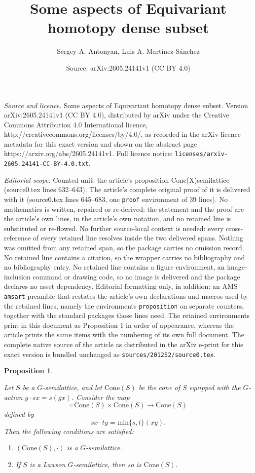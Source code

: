 \documentclass[10pt,a4paper]{amsart}
\title{Some aspects of Equivariant homotopy dense subset}
\author{Sergey A. Antonyan, Luis A. Mart\'inez-S\'anchez}
\date{Source: arXiv:2605.24141v1 (CC BY 4.0)}
\newtheorem{proposition}{Proposition}
\begin{document}
\maketitle

\noindent\emph{Source and licence.} Some aspects of Equivariant homotopy dense subset. Version arXiv:2605.24141v1 (CC BY 4.0), distributed by arXiv under the Creative Commons Attribution 4.0 International licence, http://creativecommons.org/licenses/by/4.0/, as recorded in the arXiv licence metadata for this exact version and shown on the abstract page https://arxiv.org/abs/2605.24141v1. Full licence notice: \texttt{licenses/arxiv-2605.24141-CC-BY-4.0.txt}.\par\smallskip

\noindent\textit{Editorial scope.} Counted unit: the article's proposition Cone(X)semilattice (source0.tex lines 632--643). The article's complete original proof of it is delivered with it (source0.tex lines 645--683, one \texttt{proof} environment of 39 lines). No mathematics is written, repaired or re-derived: the statement and the proof are the article's own lines, in the article's own notation, and no retained line is substituted or re-flowed.  No further source-local context is needed: every cross-reference of every retained line resolves inside the two delivered spans.  Nothing was omitted from any retained span, so the package carries no omission record.  No retained line contains a citation, so the wrapper carries no bibliography and no bibliography entry.  No retained line contains a figure environment, an image-inclusion command or drawing code, so no image is delivered and the package declares no asset dependency.  Editorial formatting only, in addition: an AMS \texttt{amsart} preamble that restates the article's own declarations and macros used by the retained lines, namely the environments \texttt{proposition} on separate counters, together with the standard packages those lines need.  The retained environments print in this document as Proposition 1 in order of appearance, whereas the article prints the same items with the numbering of its own full document.  The complete native source of the article as distributed in the arXiv e-print for this exact version is bundled unchanged as \texttt{sources/201252/source0.tex}.
	\begin{proposition}\label{Cone(X)semilattice}
		\rm{Let $S$ be a $G$-semilattice, and let $\mathrm{Cone}(S)$ be the cone of $S$ equipped with the $G$-action $g\cdot sx=s(gx)$. Consider the map 
		$$\cdot: \mathrm{Cone}(S)\times \mathrm{Cone}(S)\rightarrow \mathrm{Cone}(S)$$
		 defined by 
		 $$sx\cdot ty=\mbox{min}\{s,t\}(xy).$$ 
		 Then the following conditions are satisfied:
			
			\begin{enumerate}
				\item [(i)] $(\mathrm{Cone}(S),\cdot)$ is a $G$-semilattice.
				\item [(ii)] If $S$ is a Lawson $G$-semilattice, then so is $\mathrm{Cone}(S)$.
		\end{enumerate}}
	\end{proposition}
\end{document}
